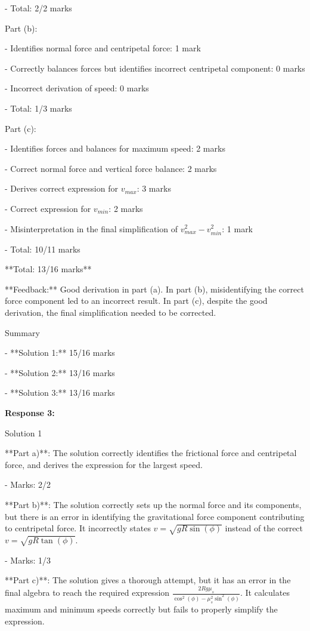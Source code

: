 \documentclass[a4paper,11pt]{article}
\begin{document}
- Total: 2/2 marks

Part (b): 

- Identifies normal force and centripetal force: 1 mark

- Correctly balances forces but identifies incorrect centripetal component: 0 marks

- Incorrect derivation of speed: 0 marks

- Total: 1/3 marks

Part (c): 

- Identifies forces and balances for maximum speed: 2 marks

- Correct normal force and vertical force balance: 2 marks

- Derives correct expression for \( v_{max} \): 3 marks

- Correct expression for \( v_{min} \): 2 marks

- Misinterpretation in the final simplification of \( v_{max}^2 - v_{min}^2 \): 1 mark

- Total: 10/11 marks

**Total: 13/16 marks**

**Feedback:** Good derivation in part (a). In part (b), misidentifying the correct force component led to an incorrect result. In part (c), despite the good derivation, the final simplification needed to be corrected. 

Summary

- **Solution 1:** 15/16 marks

- **Solution 2:** 13/16 marks

- **Solution 3:** 13/16 marks

\bigskip
\textbf{Response 3:}

Solution 1

**Part a)**: The solution correctly identifies the frictional force and centripetal force, and derives the expression for the largest speed.

- Marks: 2/2

**Part b)**: The solution correctly sets up the normal force and its components, but there is an error in identifying the gravitational force component contributing to centripetal force. It incorrectly states \( v = \sqrt{gR\sin(\phi)} \) instead of the correct \( v = \sqrt{gR\tan(\phi)} \).

- Marks: 1/3

**Part c)**: The solution gives a thorough attempt, but it has an error in the final algebra to reach the required expression \( \frac{2Rg\mu_s}{\cos^2(\phi) - \mu_s^2 \sin^2(\phi)} \). It calculates maximum and minimum speeds correctly but fails to properly simplify the expression.
\end{document}

